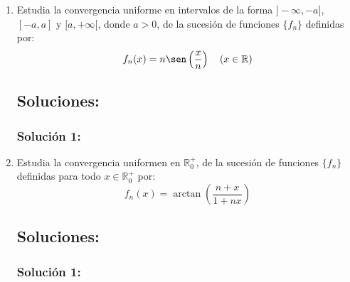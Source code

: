 \documentclass[a4paper, 11pt]{article} %
\begin{document}
\begin{enumerate}
	\item Estudia la convergencia uniforme en intervalos de la forma $]-\infty, -a]$, $[-a,a]$ y
	$[a, +\infty[$, donde $a > 0$, de la sucesión de funciones $\{f_n\}$ definidas por:
	$$f_n(x) = n \sen\left(\frac{x}{n}\right) \quad (x \in \mathbb{R})$$
	\subsection*{Soluciones:}
		\subsubsection*{Solución 1:}
	
	\item Estudia la convergencia uniformen en $\mathbb{R}^+_0$, de la sucesión de funciones $\{f_n\}$
	definidas para todo $x \in \mathbb{R}^+_0$ por:
	$$f_n(x) = \arctan\left(\frac{n+x}{1+nx}\right)$$
	\subsection*{Soluciones:}
		\subsubsection*{Solución 1:}
\end{enumerate}
\end{document}
